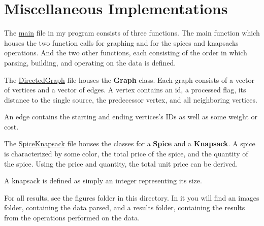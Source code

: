\documentclass[12pt, letterpaper]{article}
\begin{document}
\section{Miscellaneous Implementations} \label{MiscImp}
The \underline{main} file in my program consists of three functions.
The main function which houses the two function calls for graphing and for the spices and knapsacks operations.
And the two other functions, each consisting of the order in which parsing, building, and operating on the data is defined.
\begin{center}
   
\end{center}
The \underline{DirectedGraph} file houses the \textbf{Graph} class.
Each graph consists of a vector of vertices and a vector of edges.
A vertex contains an id, a processed flag, its distance to the single source, the predecessor vertex, and all neighboring vertices.
\begin{center}
   
\end{center}
An edge contains the starting and ending vertices's IDs as well as some weight or cost.
\begin{center}
   
\end{center}
The \underline{SpiceKnapsack} file houses the classes for a \textbf{Spice} and a \textbf{Knapsack}.
A spice is characterized by some color, the total price of the spice, and the quantity of the spice.
Using the price and quantity, the total unit price can be derived.
\begin{center}
   
\end{center}
A knapsack is defined as simply an integer representing its size.
\begin{center}
   
\end{center}
For all results, see the figures folder in this directory.
In it you will find an images folder, containing the data parsed, and a results folder, containing the results from the operations performed on the data.
\end{document}
